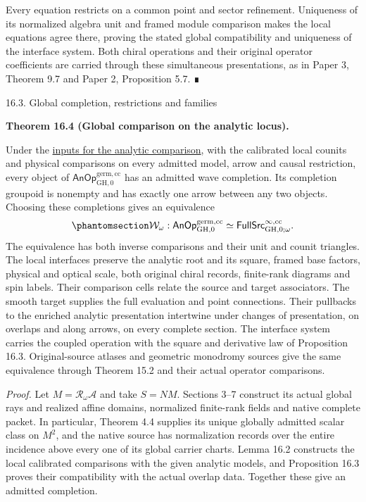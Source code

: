 \documentclass[
  english,
  11pt,
  reqno]{amsart}
\makeatletter
\newcounter{none} %
\newcommand{\paperstatementsection}{\@startsection{subsection}{2}%
  \z@{.5\linespacing\@plus.7\linespacing}{.35\baselineskip}%
  {\normalfont\bfseries}}
\newcommand{\paperfirststatement}[1]{%
  {\normalfont\bfseries #1\par}%
  \nobreak\@afterindenttrue\@afterheading}
\makeatother
\begin{document}
Every equation restricts on a common point and sector refinement.
Uniqueness of its normalized algebra unit and framed module comparison
makes the local equations agree there, proving the stated global
compatibility and uniqueness of the interface system. Both chiral
operations and their original operator coefficients are carried through
these simultaneous presentations, as in Paper 3, Theorem 9.7 and Paper
2, Proposition 5.7. ∎

\protect{}\label{sec:analytic-wave-global-equivalence}
\paperstatementsection{16.3. Global completion, restrictions and
families}\label{global-completion-restrictions-and-families}
\paperfirststatement{\protect{}\label{thm:global-analytic-wave-comparison}Theorem 16.4 (Global comparison on the analytic locus).}

Under the \hyperref[sec:analytic-interface-input-contract]{inputs for
the analytic comparison}, with the calibrated local counits and physical
comparisons on every admitted model, arrow and causal restriction, every
object of \(\mathsf{AnOp}^{\mathrm{germ},\mathrm{cc}}_{\mathrm{GH},0}\)
has an admitted wave completion. Its completion groupoid is nonempty and
has exactly one arrow between any two objects. Choosing these
completions gives an equivalence
\begin{equation}\protect\phantomsection\label{eq:global-analytic-wave-equivalence}{
\mathcal W_\omega:
\mathsf{AnOp}^{\mathrm{germ},\mathrm{cc}}_{\mathrm{GH},0}
\simeq
\mathsf{FullSrc}^{\infty,\mathrm{cc}}_{\mathrm{GH},0;\omega}.
}\end{equation} The equivalence has both inverse comparisons and their
unit and counit triangles. The local interfaces preserve the analytic
root and its square, framed base factors, physical and optical scale,
both original chiral records, finite-rank diagrams and spin labels.
Their comparison cells relate the source and target associators. The
smooth target supplies the full evaluation and point connections. Their
pullbacks to the enriched analytic presentation intertwine under changes
of presentation, on overlaps and along arrows, on every complete
section. The interface system carries the coupled operation with the
square and derivative law of Proposition 16.3. Original-source atlases
and geometric monodromy sources give the same equivalence through
Theorem 15.2 and their actual operator comparisons.

\emph{Proof.} Let \(M=\mathcal R_\omega\mathcal A\) and take \(S=N M\).
Sections 3--7 construct its actual global rays and realized affine
domains, normalized finite-rank fields and native complete packet. In
particular, Theorem 4.4 supplies its unique globally admitted scalar
class on \(M^2\), and the native source has normalization records over
the entire incidence above every one of its global carrier charts. Lemma
16.2 constructs the local calibrated comparisons with the given analytic
models, and Proposition 16.3 proves their compatibility with the actual
overlap data. Together these give an admitted completion.
\end{document}
